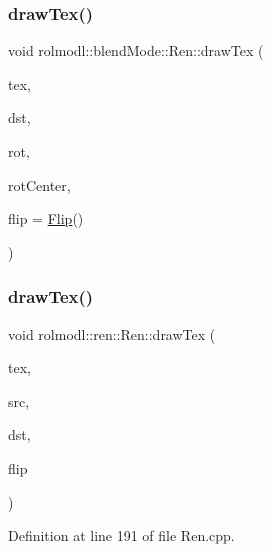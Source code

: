 \subsubsection{\texorpdfstring{drawTex()}{drawTex()}\hspace{0.1cm}{\footnotesize\ttfamily [24/36]}}
{\footnotesize\ttfamily void rolmodl\+::blend\+Mode\+::\+Ren\+::draw\+Tex (\begin{DoxyParamCaption}\item[{Tex \&}]{tex,  }\item[{const \mbox{\hyperlink{structrolmodl_1_1blend_mode_1_1_dst_rect_x_y}{Dst\+Rect\+XY}}}]{dst,  }\item[{const double}]{rot,  }\item[{const \mbox{\hyperlink{structrolmodl_1_1geom_1_1_pos}{geom\+::\+Pos}}}]{rot\+Center,  }\item[{const \mbox{\hyperlink{structrolmodl_1_1blend_mode_1_1_flip}{Flip}}}]{flip = {\ttfamily \mbox{\hyperlink{structrolmodl_1_1blend_mode_1_1_flip}{Flip}}()} }\end{DoxyParamCaption})}

\mbox{\label{classrolmodl_1_1blend_mode_1_1_ren_abc804f35e49bed450df9f3e7f4f1eb45}} 
\subsubsection{\texorpdfstring{drawTex()}{drawTex()}\hspace{0.1cm}{\footnotesize\ttfamily [25/36]}}
{\footnotesize\ttfamily void rolmodl\+::ren\+::\+Ren\+::draw\+Tex (\begin{DoxyParamCaption}\item[{Tex \&}]{tex,  }\item[{const \mbox{\hyperlink{structrolmodl_1_1blend_mode_1_1_src_rect_w_h}{Src\+Rect\+WH}}}]{src,  }\item[{const \mbox{\hyperlink{structrolmodl_1_1blend_mode_1_1_dst_rect_w_h}{Dst\+Rect\+WH}}}]{dst,  }\item[{const \mbox{\hyperlink{structrolmodl_1_1blend_mode_1_1_flip}{Flip}}}]{flip }\end{DoxyParamCaption})}



Definition at line 191 of file Ren.\+cpp.

